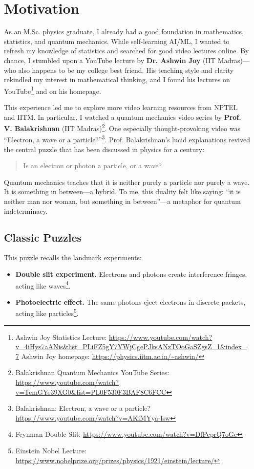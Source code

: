 \section{Motivation}



As an M.Sc. physics graduate, I already had a good foundation in mathematics, statistics, and quantum mechanics. While self-learning AI/ML, I wanted to refresh my knowledge of statistics and searched for good video lectures online. By chance, I stumbled upon a YouTube lecture by \textbf{Dr. Ashwin Joy} (IIT Madras)---who also happens to be my college best friend. His teaching style and clarity rekindled my interest in mathematical thinking, and I found his lectures on YouTube\footnote{Ashwin Joy Statistics Lecture: \url{https://www.youtube.com/watch?v=4iHys7aANis&list=PLiFZ5gY7YWjCgePJksANzTOoGaSZgsZ_1&index=7} \newline Ashwin Joy homepage: \url{https://physics.iitm.ac.in/~ashwin/}} and on his homepage.


This experience led me to explore more video learning resources from NPTEL and IITM. In particular, I watched a quantum mechanics video series by \textbf{Prof. V. Balakrishnan} (IIT Madras)\footnote{Balakrishnan Quantum Mechanics YouTube Series: \url{https://www.youtube.com/watch?v=TcmGYe39XG0&list=PL0F530F3BAF8C6FCC}}. One especially thought-provoking video was ``Electron, a wave or a particle?''\footnote{Balakrishnan: Electron, a wave or a particle? \url{https://www.youtube.com/watch?v=AKiMYya-lsw}}. Prof. Balakrishnan's lucid explanations revived the central puzzle that has been discussed in physics for a century:

\begin{quote}
Is an electron or photon a particle, or a wave?
\end{quote}

Quantum mechanics teaches that it is neither purely a particle nor purely a wave. It is something in between—a hybrid. To me, this duality felt like saying: ``it is neither man nor woman, but something in between''—a metaphor for quantum indeterminacy.

\subsection*{Classic Puzzles}

This puzzle recalls the landmark experiments:

\begin{itemize}
	\item \textbf{Double slit experiment.} Electrons and photons create interference fringes, acting like waves\footnote{Feynman Double Slit: \url{https://www.youtube.com/watch?v=DfPeprQ7oGc}}.
	\item \textbf{Photoelectric effect.} The same photons eject electrons in discrete packets, acting like particles\footnote{Einstein Nobel Lecture: \url{https://www.nobelprize.org/prizes/physics/1921/einstein/lecture/}}.
\end{itemize}

